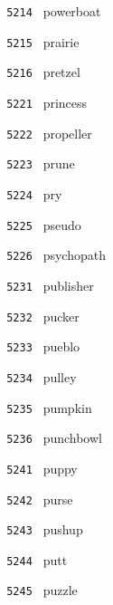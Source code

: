 \documentclass[11pt]{article}
\begin{document}
\begin{multicols}{6}
\noindent \texttt{ 5214 } \hspace{1mm} powerboat  \par
\noindent \texttt{ 5215 } \hspace{1mm} prairie  \par
\noindent \texttt{ 5216 } \hspace{1mm} pretzel  \par
\noindent \texttt{ 5221 } \hspace{1mm} princess  \par
\noindent \texttt{ 5222 } \hspace{1mm} propeller  \par
\noindent \texttt{ 5223 } \hspace{1mm} prune  \par
\noindent \texttt{ 5224 } \hspace{1mm} pry  \par
\noindent \texttt{ 5225 } \hspace{1mm} pseudo  \par
\noindent \texttt{ 5226 } \hspace{1mm} psychopath  \par
\noindent \texttt{ 5231 } \hspace{1mm} publisher  \par
\noindent \texttt{ 5232 } \hspace{1mm} pucker  \par
\noindent \texttt{ 5233 } \hspace{1mm} pueblo  \par
\noindent \texttt{ 5234 } \hspace{1mm} pulley  \par
\noindent \texttt{ 5235 } \hspace{1mm} pumpkin  \par
\noindent \texttt{ 5236 } \hspace{1mm} punchbowl  \par
\noindent \texttt{ 5241 } \hspace{1mm} puppy  \par
\noindent \texttt{ 5242 } \hspace{1mm} purse  \par
\noindent \texttt{ 5243 } \hspace{1mm} pushup  \par
\noindent \texttt{ 5244 } \hspace{1mm} putt  \par
\noindent \texttt{ 5245 } \hspace{1mm} puzzle  \par

\end{multicols}
\end{document}
